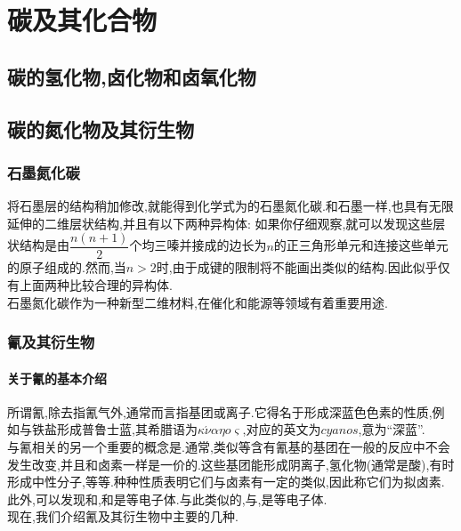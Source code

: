 \documentclass{ctexart}
\begin{document}
\section{碳及其化合物}
\subsection{碳的氢化物,卤化物和卤氧化物}
\subsection{碳的氮化物及其衍生物}
\subsubsection{石墨氮化碳}
将石墨层的结构稍加修改,就能得到化学式为的石墨氮化碳.和石墨一样,也具有无限延伸的二维层状结构,并且有以下两种异构体:
如果你仔细观察,就可以发现这些层状结构是由$\dfrac{n(n+1)}{2}$个均三嗪并接成的边长为$n$的正三角形单元和连接这些单元的原子组成的.然而,当$n>2$时,由于成键的限制将不能画出类似的结构.因此似乎仅有上面两种比较合理的异构体.\\
\indent 石墨氮化碳作为一种新型二维材料,在催化和能源等领域有着重要用途.
\subsubsection{氰及其衍生物}
\paragraph{关于氰的基本介绍}
所谓氰,除去指氰气外,通常而言指基团或离子.它得名于形成深蓝色色素的性质,例如与铁盐形成普鲁士蓝,其希腊语为$\kappa\acute{\nu}\alpha\eta o\varsigma$,对应的英文为$cyanos$,意为“深蓝”.\\
\indent 与氰相关的另一个重要的概念是.通常,类似等含有氰基的基团在一般的反应中不会发生改变,并且和卤素一样是一价的.这些基团能形成阴离子,氢化物(通常是酸),有时形成中性分子,等等.种种性质表明它们与卤素有一定的类似,因此称它们为拟卤素.\\
\indent 此外,可以发现和,和是等电子体.与此类似的,与,是等电子体.\\
\indent 现在,我们介绍氰及其衍生物中主要的几种.
\end{document}
